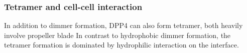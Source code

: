 \subsubsection{Tetramer and cell-cell interaction}

In addition to dimmer formation, DPP4 can also form tetramer, both heavily involve propeller blade  In contrast to hydrophobic dimmer formation, the tetramer formation is dominated by hydrophilic interaction on the interface.~\cite{Engel_2003} 